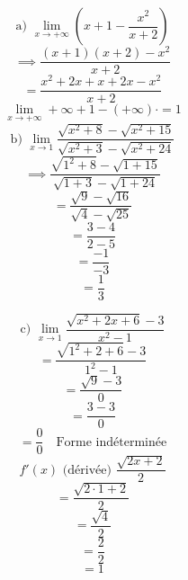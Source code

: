 \documentclass{article}
\begin{document}
\[ \text{a) } \lim_{x \to +\infty} \left( x+1 - \frac{x^2}{x+2} \right) \]
\[ \implies \frac{(x+1)(x+2) - x^2}{x+2} \]
\[ = \frac{x^2+2x+x+2x - x^2}{x+2} \]
\[ \lim_{x \to +\infty} + \infty + 1 - (+ \infty) \cdot = 1 \]
\[ \text{b) } \lim_{x \to 1} \frac{\sqrt{x^2+8} - \sqrt{x^2+15}}{\sqrt{x^2+3} - \sqrt{x^2+24}} \]
\[ \implies \frac{\sqrt{1^2+8} - \sqrt{1+15}}{\sqrt{1+3} - \sqrt{1+24}} \]
\[ = \frac{\sqrt{9} - \sqrt{16}}{\sqrt{4} - \sqrt{25}} \]
\[ = \frac{3 - 4}{2 - 5} \]
\[ = \frac{-1}{-3} \]
\[ = \frac{1}{3} \]

\[ \text{c) } \lim_{x \to 1} \frac{\sqrt{x^2+2x+6} - 3}{x^2-1} \]
\[ = \frac{\sqrt{1^2+2+6} - 3}{1^2-1} \]
\[ = \frac{\sqrt{9} - 3}{0} \]
\[ = \frac{3 - 3}{0} \]
\[ = \frac{0}{0} \quad \text{Forme indéterminée} \]
\[ f'(x) \text{ (dérivée) } \frac{\sqrt{2x+2}}{2} \]
\[ = \frac{\sqrt{2\cdot1+2}}{2} \]
\[ = \frac{\sqrt{4}}{2} \]
\[ = \frac{2}{2} \]
\[ = 1 \]
\end{document}
